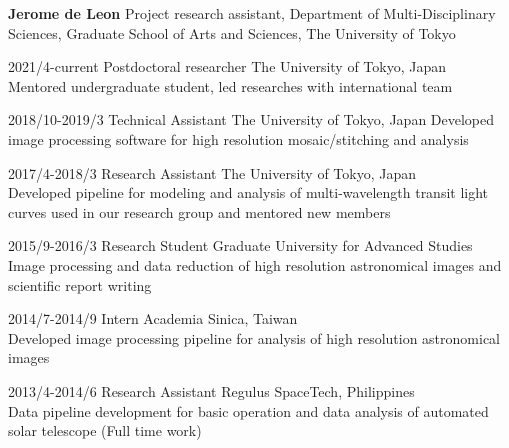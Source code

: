 \documentclass[12pt,letterpaper]{article}
\begin{document}
\thispagestyle{empty}\sloppy\sloppypar\raggedbottom

\textbf{\Large Jerome de Leon} \hfill
Project research assistant, Department of Multi-Disciplinary Sciences, Graduate School of Arts and Sciences, The University of Tokyo\\[0.5ex]

\begin{list}{}{\cvlist}
\item 2021/4-current	Postdoctoral researcher	The University of Tokyo, Japan\\
Mentored undergraduate student, led researches with international team\\
\item 2018/10-2019/3	Technical Assistant		The University of Tokyo, Japan
Developed image processing software for high resolution mosaic/stitching and analysis\\
\item 2017/4-2018/3 	Research Assistant		The University of Tokyo, Japan\\
Developed pipeline for modeling and analysis of multi-wavelength transit light curves used in our research group and mentored new members\\ 
\item 2015/9-2016/3 	Research Student		Graduate University for Advanced Studies\\
Image processing and data reduction of high resolution astronomical images and scientific report writing\\
\item 2014/7-2014/9		Intern				Academia Sinica, Taiwan\\
Developed image processing pipeline for analysis of high resolution astronomical images\\
\item 2013/4-2014/6  	Research Assistant 	Regulus SpaceTech, Philippines\\
Data pipeline development for basic operation and data analysis of automated solar telescope (Full time work)\\

\end{list}

\begin{list}{}{\cvlist}

\end{list}
\end{document}
